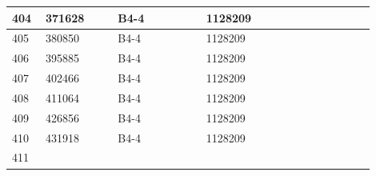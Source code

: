 \documentclass[UTF8,10pt,a4paper,fontset=fandol]{ctexart}
\newcommand{\fieldvalue}[1]{#1}
\begin{document}
\begin{center}
\begin{tabular}{|p{0.08\linewidth}|p{0.18\linewidth}|p{0.22\linewidth}|p{0.22\linewidth}|p{0.20\linewidth}|}
\fieldvalue{404} &
\fieldvalue{371628} &
\fieldvalue{B4-4} &
\fieldvalue{1128209} & \\ \hline
\fieldvalue{405} &
\fieldvalue{380850} &
\fieldvalue{B4-4} &
\fieldvalue{1128209} & \\ \hline
\fieldvalue{406} &
\fieldvalue{395885} &
\fieldvalue{B4-4} &
\fieldvalue{1128209} & \\ \hline
\fieldvalue{407} &
\fieldvalue{402466} &
\fieldvalue{B4-4} &
\fieldvalue{1128209} & \\ \hline
\fieldvalue{408} &
\fieldvalue{411064} &
\fieldvalue{B4-4} &
\fieldvalue{1128209} & \\ \hline
\fieldvalue{409} &
\fieldvalue{426856} &
\fieldvalue{B4-4} &
\fieldvalue{1128209} & \\ \hline
\fieldvalue{410} &
\fieldvalue{431918} &
\fieldvalue{B4-4} &
\fieldvalue{1128209} & \\ \hline
\fieldvalue{411} &

\end{tabular}
\end{center}
\end{document}
